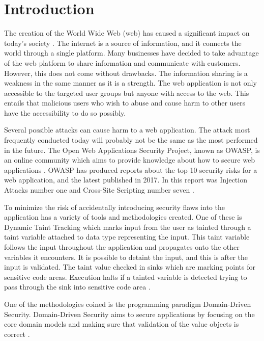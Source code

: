 \chapter{Introduction}
\label{Introduction}
The creation of the World Wide Web (web) has caused a significant impact on today's society \parencite{www}. The internet is a source of information, and it connects the world through a single platform. Many businesses have decided to take advantage of the web platform to share information and communicate with customers. However, this does not come without drawbacks. The information sharing is a weakness in the same manner as it is a strength. The web application is not only accessible to the targeted user groups but anyone with access to the web. This entails that malicious users who wish to abuse and cause harm to other users have the accessibility to do so possibly.

Several possible attacks can cause harm to a web application. The attack most frequently conducted today will probably not be the same as the most performed in the future. The Open Web Applications Security Project, known as OWASP, is an online community which aims to provide knowledge about how to secure web applications \parencite{OpenWebApplicationSecurityProject}. OWASP has produced reports about the top 10 security risks for a web application, and the latest published in 2017. In this report was Injection Attacks number one and Cross-Site Scripting number seven \parencite{OWASP2017, OpenWebApplicationSecurityProject, CrossMichael2007Dgtw}.

To minimize the risk of accidentally introducing security flaws into the application has a variety of tools and methodologies created. One of these is Dynamic Taint Tracking which marks input from the user as tainted through a taint variable attached to data type representing the input. This taint variable follows the input throughout the application and propagates onto the other variables it encounters. It is possible to detaint the input, and this is after the input is validated. The taint value checked in sinks which are marking points for sensitive code areas. Execution halts if a tainted variable is detected trying to pass through the sink into sensitive code area \parencite{Pan2015, Venkataramani2008}. 

One of the methodologies coined is the programming paradigm Domain-Driven Security. Domain-Driven Security aims to secure applications by focusing on the core domain models and making sure that validation of the value objects is correct \parencite{Wilander2009, Johnsson2009}.

